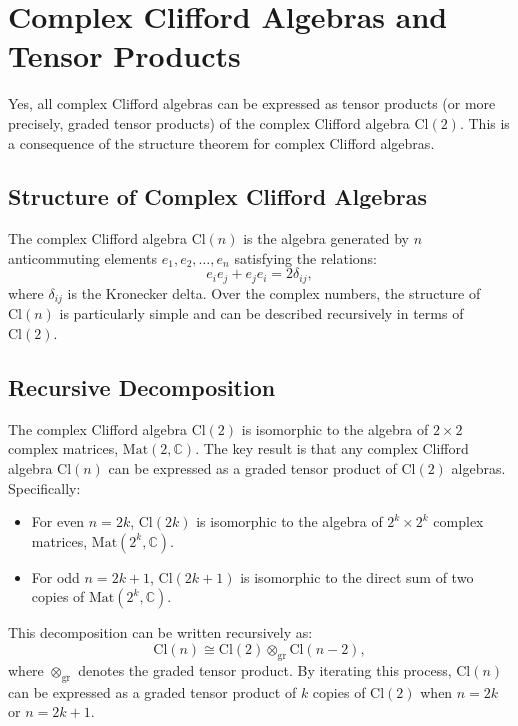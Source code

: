 \documentclass{article}
\begin{document}
\section*{Complex Clifford Algebras and Tensor Products}

Yes, all complex Clifford algebras can be expressed as tensor products (or more precisely, graded tensor products) of the complex Clifford algebra \( \text{Cl}(2) \). This is a consequence of the structure theorem for complex Clifford algebras.

\subsection*{Structure of Complex Clifford Algebras}
The complex Clifford algebra \( \text{Cl}(n) \) is the algebra generated by \( n \) anticommuting elements \( e_1, e_2, \dots, e_n \) satisfying the relations:
\[
e_i e_j + e_j e_i = 2 \delta_{ij},
\]
where \( \delta_{ij} \) is the Kronecker delta. Over the complex numbers, the structure of \( \text{Cl}(n) \) is particularly simple and can be described recursively in terms of \( \text{Cl}(2) \).

\subsection*{Recursive Decomposition}
The complex Clifford algebra \( \text{Cl}(2) \) is isomorphic to the algebra of \( 2 \times 2 \) complex matrices, \( \text{Mat}(2, \mathbb{C}) \). The key result is that any complex Clifford algebra \( \text{Cl}(n) \) can be expressed as a graded tensor product of \( \text{Cl}(2) \) algebras. Specifically:
\begin{itemize}
    \item For even \( n = 2k \), \( \text{Cl}(2k) \) is isomorphic to the algebra of \( 2^k \times 2^k \) complex matrices, \( \text{Mat}(2^k, \mathbb{C}) \).
    \item For odd \( n = 2k + 1 \), \( \text{Cl}(2k + 1) \) is isomorphic to the direct sum of two copies of \( \text{Mat}(2^k, \mathbb{C}) \).
\end{itemize}

This decomposition can be written recursively as:
\[
\text{Cl}(n) \cong \text{Cl}(2) \otimes_{\text{gr}} \text{Cl}(n-2),
\]
where \( \otimes_{\text{gr}} \) denotes the graded tensor product. By iterating this process, \( \text{Cl}(n) \) can be expressed as a graded tensor product of \( k \) copies of \( \text{Cl}(2) \) when \( n = 2k \) or \( n = 2k + 1 \).
\end{document}
